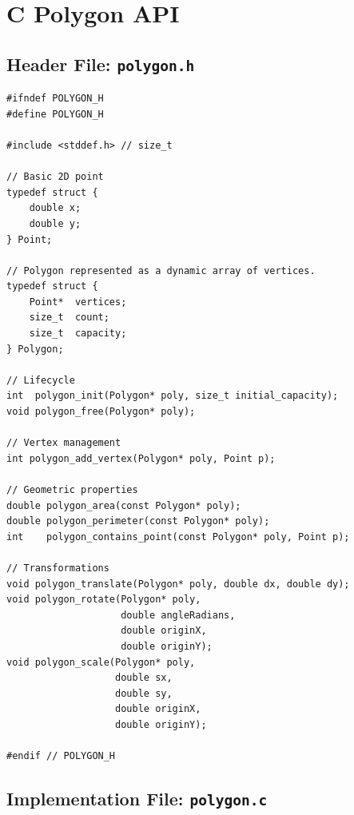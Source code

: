 \documentclass[11pt,a4paper]{article}
\begin{document}
\clearpage

\section{C Polygon API}

\subsection{Header File: \texttt{polygon.h}}

\begin{verbatim}
#ifndef POLYGON_H
#define POLYGON_H

#include <stddef.h> // size_t

// Basic 2D point
typedef struct {
    double x;
    double y;
} Point;

// Polygon represented as a dynamic array of vertices.
typedef struct {
    Point*  vertices;
    size_t  count;
    size_t  capacity;
} Polygon;

// Lifecycle
int  polygon_init(Polygon* poly, size_t initial_capacity);
void polygon_free(Polygon* poly);

// Vertex management
int polygon_add_vertex(Polygon* poly, Point p);

// Geometric properties
double polygon_area(const Polygon* poly);
double polygon_perimeter(const Polygon* poly);
int    polygon_contains_point(const Polygon* poly, Point p);

// Transformations
void polygon_translate(Polygon* poly, double dx, double dy);
void polygon_rotate(Polygon* poly,
                    double angleRadians,
                    double originX,
                    double originY);
void polygon_scale(Polygon* poly,
                   double sx,
                   double sy,
                   double originX,
                   double originY);

#endif // POLYGON_H
\end{verbatim}

\subsection{Implementation File: \texttt{polygon.c}}
\end{document}
